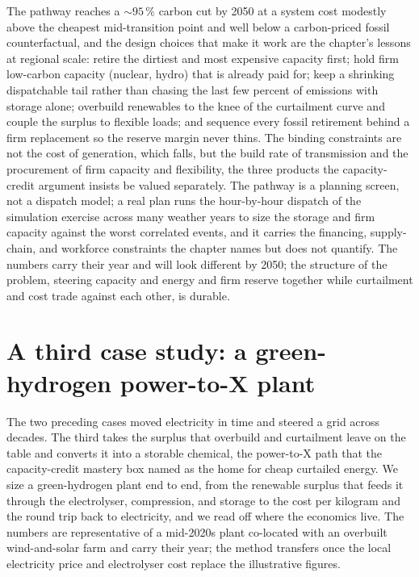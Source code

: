 The pathway reaches a $\sim 95\,\%$ carbon cut by 2050 at a system cost
modestly above the cheapest mid-transition point and well below a
carbon-priced fossil counterfactual, and the design choices that make it
work are the chapter's lessons at regional scale: retire the dirtiest and
most expensive capacity first; hold firm low-carbon capacity (nuclear,
hydro) that is already paid for; keep a shrinking dispatchable tail rather
than chasing the last few percent of emissions with storage alone;
overbuild renewables to the knee of the curtailment curve and couple the
surplus to flexible loads; and sequence every fossil retirement behind a
firm replacement so the reserve margin never thins. The binding constraints
are not the cost of generation, which falls, but the build rate of
transmission and the procurement of firm capacity and flexibility, the
three products the capacity-credit argument insists be valued separately.
The pathway is a planning screen, not a dispatch model; a real plan runs
the hour-by-hour dispatch of the simulation exercise across many weather
years to size the storage and firm capacity against the worst correlated
events, and it carries the financing, supply-chain, and workforce
constraints the chapter names but does not quantify. The numbers carry
their year and will look different by 2050; the structure of the problem,
steering capacity and energy and firm reserve together while curtailment
and cost trade against each other, is durable.





\section{A third case study: a green-hydrogen power-to-X plant}

The two preceding cases moved electricity in time and steered a grid across
decades. The third takes the surplus that overbuild and curtailment leave
on the table and converts it into a storable chemical, the power-to-X path
that the capacity-credit mastery box named as the home for cheap curtailed
energy. We size a green-hydrogen plant end to end, from the renewable
surplus that feeds it through the electrolyser, compression, and storage to
the cost per kilogram and the round trip back to electricity, and we read
off where the economics live. The numbers are representative of a
mid-2020s plant co-located with an overbuilt wind-and-solar farm and carry
their year; the method transfers once the local electricity price and
electrolyser cost replace the illustrative figures.

